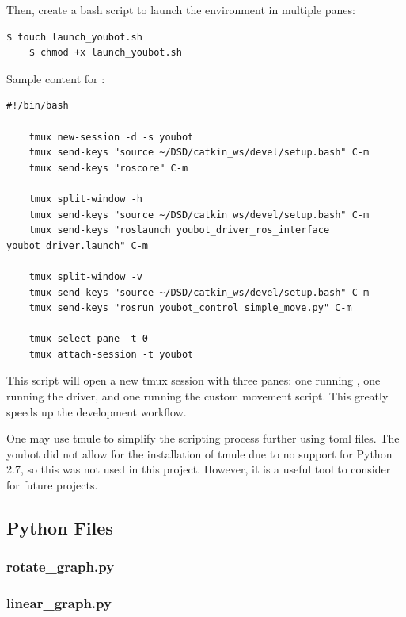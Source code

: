 \documentclass[a4paper, 12pt]{article}
\newcommand{\code}[1]{\texttt{\detokenize{#1}}}
\begin{document}
    Then, create a bash script to launch the environment in multiple panes:

    \begin{lstlisting}[style=plain]
    $ touch launch_youbot.sh
    $ chmod +x launch_youbot.sh
    \end{lstlisting}

    Sample content for \code{launch_youbot.sh}:

    \begin{lstlisting}[style=plain]
    #!/bin/bash

    tmux new-session -d -s youbot
    tmux send-keys "source ~/DSD/catkin_ws/devel/setup.bash" C-m
    tmux send-keys "roscore" C-m

    tmux split-window -h
    tmux send-keys "source ~/DSD/catkin_ws/devel/setup.bash" C-m
    tmux send-keys "roslaunch youbot_driver_ros_interface youbot_driver.launch" C-m

    tmux split-window -v
    tmux send-keys "source ~/DSD/catkin_ws/devel/setup.bash" C-m
    tmux send-keys "rosrun youbot_control simple_move.py" C-m

    tmux select-pane -t 0
    tmux attach-session -t youbot
    \end{lstlisting}

    This script will open a new tmux session with three panes: one running \code{roscore}, one running the driver, and one running the custom movement script. This greatly speeds up the development workflow.

    One may use tmule to simplify the scripting process further using toml files. The youbot did not allow for the installation of tmule due to no support for Python 2.7, so this was not used in this project. However, it is a useful tool to consider for future projects.
   
    \pagebreak
    \subsection{Python Files}
    \subsubsection{rotate\_graph.py}
    
    \pagebreak
    \subsubsection{linear\_graph.py}
    
    \pagebreak
\end{document}
